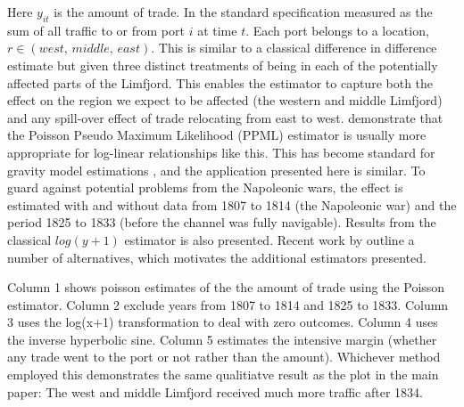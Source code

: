 Here $y_{it}$ is the amount of trade. In the standard specification measured as the sum of all traffic to or from port $i$ at time $t$. Each port belongs to a location, $r \in (west,\, middle,\, east)$. This is similar to a classical difference in difference estimate but given three distinct treatments of being in each of the potentially affected parts of the Limfjord. This enables the estimator to capture both the effect on the region we expect to be affected (the western and middle Limfjord) and any spill-over effect of trade relocating from east to west. \cite{Silva2006} demonstrate that the Poisson Pseudo Maximum Likelihood (PPML) estimator is usually more appropriate for log-linear relationships like this. This has become standard for gravity model estimations \citep{Marczinek2022, SantosSilva2022}, and the application presented here is similar. To guard against potential problems from the Napoleonic wars, the effect is estimated with and without data from 1807 to 1814 (the Napoleonic war) and the period 1825 to 1833 (before the channel was fully navigable). Results from the classical $log(y+1)$ estimator is also presented. Recent work by \cite{roth2023loglike} outline a number of alternatives, which motivates the additional estimators presented.

Column 1 shows poisson estimates of the the amount of trade using the Poisson estimator. Column 2 exclude years from 1807 to 1814 and 1825 to 1833. Column 3 uses the log(x+1) transformation to deal with zero outcomes. Column 4 uses the inverse hyperbolic sine. Column 5 estimates the intensive margin (whether any trade went to the port or not rather than the amount). Whichever method employed this demonstrates the same qualitiatve result as the plot in the main paper: The west and middle Limfjord received much more traffic after 1834.  

